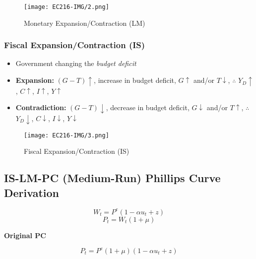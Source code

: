 \documentclass[11pt, english]{article}
\begin{document}
	\begin{figure}[H]
	\begin{center}
		\texttt{[image: EC216-IMG/2.png]}
	\end{center}
		\caption{Monetary Expansion/Contraction (LM)}
	\end{figure}

		\subsubsection{Fiscal Expansion/Contraction (IS)}

	\begin{itemize}                                             
        \setlength\itemsep{0cm}                                     
		\item Government changing the \textit{budget deficit} 
		\item \textbf{Expansion:} $(G-T)\uparrow$, increase in budget deficit, $G\uparrow$ and/or $T\downarrow$, $\therefore$ $Y_D\uparrow$, $C\uparrow$, $I\uparrow$, $Y\uparrow$
		\item \textbf{Contradiction:} $(G-T)\downarrow$, decrease in budget deficit, $G\downarrow$ and/or $T\uparrow$, $\therefore$ $Y_D\downarrow$, $C\downarrow$, $I\downarrow$, $Y\downarrow$
        \end{itemize}

	\begin{figure}[H]                                                                           \begin{center}                                                                                      \texttt{[image: EC216-IMG/3.png]}                         \end{center}                                                                                        \caption{Fiscal Expansion/Contraction (IS)}
	\end{figure}

	\newpage

	\subsection{IS-LM-PC (Medium-Run) Phillips Curve Derivation}

	$$W_t=P^e(1-\alpha u_t+z)$$
	$$P_t=W_t(1+\mu)$$

	\textbf{Original PC}

	$$P_t=P^e(1+\mu)(1-\alpha u_t+z)$$
\end{document}
